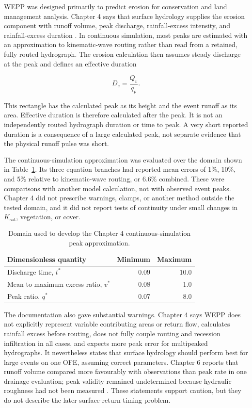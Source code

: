\documentclass[11pt]{article}
\newcommand{\Ksat}{\ensuremath{K_{\mathrm{sat}}}}
\begin{document}
WEPP was designed primarily to predict erosion for conservation and land
management analysis. Chapter 4 says that surface hydrology supplies the
erosion component with runoff volume, peak discharge, rainfall-excess
intensity, and rainfall-excess duration \cite{stone1995}. In continuous
simulation, most peaks are estimated with an approximation to kinematic-wave
routing rather than read from a retained, fully routed hydrograph. The erosion
calculation then assumes steady discharge at the peak and defines an effective
duration

\begin{equation}
  D_e=\frac{Q_v}{q_p}.
\end{equation}

This rectangle has the calculated peak as its height and the event runoff as
its area. Effective duration is therefore calculated after the peak. It is not
an independently routed hydrograph duration or time to peak. A very short
reported duration is a consequence of a large calculated peak, not separate
evidence that the physical runoff pulse was short.

The continuous-simulation approximation was evaluated over the domain shown
in Table~\ref{tab:stone-domain}. Its three equation branches had reported mean
errors of 1\%, 10\%, and 5\% relative to kinematic-wave routing, or 6.6\%
combined. These were comparisons with another model calculation, not with
observed event peaks. Chapter 4 did not prescribe warnings, clamps, or another
method outside the tested domain, and it did not report tests of continuity
under small changes in \Ksat{}, vegetation, or cover.

\begin{table}[H]
  \centering
  \caption{Domain used to develop the Chapter 4 continuous-simulation peak
  approximation.}
  \label{tab:stone-domain}
  \begin{tabular}{lrr}
    \toprule
    Dimensionless quantity & Minimum & Maximum \\
    \midrule
    Discharge time, $t^*$ & 0.09 & 10.0 \\
    Mean-to-maximum excess ratio, $v^*$ & 0.08 & 1.0 \\
    Peak ratio, $q^*$ & 0.07 & 8.0 \\
    \bottomrule
  \end{tabular}
\end{table}

The documentation also gave substantial warnings. Chapter 4 says WEPP does not
explicitly represent variable contributing areas or return flow, calculates
rainfall excess before routing, does not fully couple routing and recession
infiltration in all cases, and expects more peak error for multipeaked
hydrographs. It nevertheless states that surface hydrology should perform best
for large events on one OFE, assuming correct parameters. Chapter 6 reports
that runoff volume compared more favourably with observations than peak rate in
one drainage evaluation; peak validity remained undetermined because hydraulic
roughness had not been measured \cite{savabi1995}. These statements support
caution, but they do not describe the later surface-return timing problem.
\end{document}
